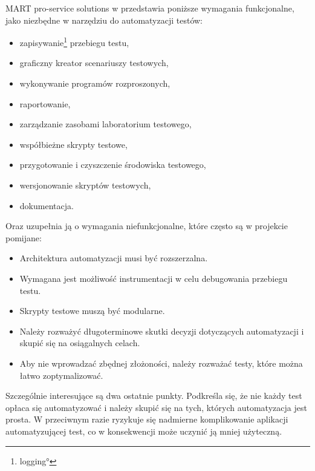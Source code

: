 \documentclass[00-praca-magisterska.tex]{subfiles}
\begin{document}
MART pro-service solutions w \cite{automation-fail} przedstawia poniższe
wymagania funkcjonalne, jako niezbędne w narzędziu do automatyzacji testów:
\begin{itemize}
\item zapisywanie\footnote{\ang{logging}} przebiegu testu,
\item graficzny kreator scenariuszy testowych,
\item wykonywanie programów rozproszonych,
\item raportowanie,
\item zarządzanie zasobami laboratorium testowego,
\item współbieżne skrypty testowe,
\item przygotowanie i czyszczenie środowiska testowego,
\item wersjonowanie skryptów testowych,
\item dokumentacja.
\end{itemize}

Oraz uzupełnia ją o wymagania niefunkcjonalne, które często są w projekcie
pomijane:
\begin{itemize}
\item Architektura automatyzacji musi być rozszerzalna.
\item Wymagana jest możliwość instrumentacji w celu debugowania przebiegu testu.
\item Skrypty testowe muszą być modularne.
\item Należy rozważyć długoterminowe skutki decyzji dotyczących automatyzacji i
skupić się na osiągalnych celach.
\item Aby nie wprowadzać zbędnej złożoności, należy rozważać testy,
które można łatwo zoptymalizować.
\end{itemize}

Szczególnie interesujące są dwa ostatnie punkty. Podkreśla się, że nie każdy
test opłaca się automatyzować i należy skupić się na tych, których
automatyzacja jest prosta. W przeciwnym razie ryzykuje się nadmierne
komplikowanie aplikacji automatyzującej test, co w konsekwencji może uczynić ją
mniej użyteczną.
\end{document}
